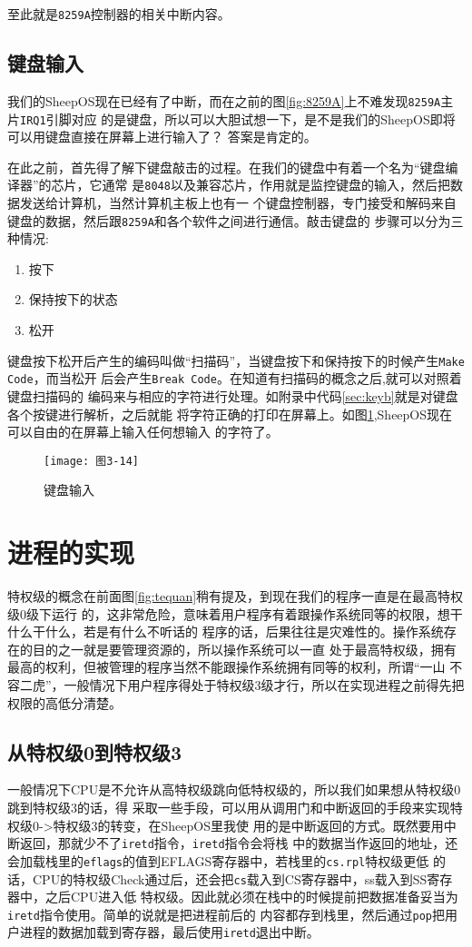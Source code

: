 至此就是\texttt{8259A}控制器的相关中断内容。

\subsection{键盘输入}

我们的SheepOS现在已经有了中断，而在之前的图\ref{fig:8259A}上不难发现\texttt{8259A}主片\texttt{IRQ1}引脚对应
的是键盘，所以可以大胆试想一下，是不是我们的SheepOS即将可以用键盘直接在屏幕上进行输入了？
答案是肯定的。

在此之前，首先得了解下键盘敲击的过程。在我们的键盘中有着一个名为“键盘编译器”的芯片，它通常
是\texttt{8048}以及兼容芯片，作用就是监控键盘的输入，然后把数据发送给计算机，当然计算机主板上也有一
个键盘控制器，专门接受和解码来自键盘的数据，然后跟\texttt{8259A}和各个软件之间进行通信。敲击键盘的
步骤可以分为三种情况:
\begin{enumerate}
\item 按下
\item 保持按下的状态
\item 松开
\end{enumerate}
键盘按下松开后产生的编码叫做“扫描码”，当键盘按下和保持按下的时候产生\texttt{Make Code}，而当松开
后会产生\texttt{Break Code}。在知道有扫描码的概念之后,就可以对照着键盘扫描码的
编码来与相应的字符进行处理。如附录中代码\ref{sec:keyb}就是对键盘各个按键进行解析，之后就能
将字符正确的打印在屏幕上。如图\ref{fig:keybd},SheepOS现在可以自由的在屏幕上输入任何想输入
的字符了。
\begin{figure}[H]
  \centering
  \texttt{[image: 图3-14]}
  \caption{键盘输入}
  \label{fig:keybd}
\end{figure}

\section{进程的实现}
\label{sec:course}
特权级的概念在前面图\ref{fig:tequan}稍有提及，到现在我们的程序一直是在最高特权级0级下运行
的，这非常危险，意味着用户程序有着跟操作系统同等的权限，想干什么干什么，若是有什么不听话的
程序的话，后果往往是灾难性的。操作系统存在的目的之一就是要管理资源的，所以操作系统可以一直
处于最高特权级，拥有最高的权利，但被管理的程序当然不能跟操作系统拥有同等的权利，所谓“一山
不容二虎”，一般情况下用户程序得处于特权级3级才行，所以在实现进程之前得先把权限的高低分清楚。

\subsection{从特权级0到特权级3}
一般情况下CPU是不允许从高特权级跳向低特权级的，所以我们如果想从特权级0跳到特权级3的话，得
采取一些手段，可以用从调用门和中断返回的手段来实现特权级0->特权级3的转变，在SheepOS里我使
用的是中断返回的方式。既然要用中断返回，那就少不了\texttt{iretd}指令\cite{ws2013}，\texttt{iretd}指令会将栈
中的数据当作返回的地址，还会加载栈里的\texttt{eflags}的值到EFLAGS寄存器中，若栈里的\texttt{cs.rpl}特权级更低
的话，CPU的特权级Check通过后，还会把\texttt{cs}载入到CS寄存器中，ss载入到SS寄存器中，之后CPU进入低
特权级。因此就必须在栈中的时候提前把数据准备妥当为\texttt{iretd}指令使用。简单的说就是把进程前后的
内容都存到栈里，然后通过\texttt{pop}把用户进程的数据加载到寄存器，最后使用\texttt{iretd}退出中断。

